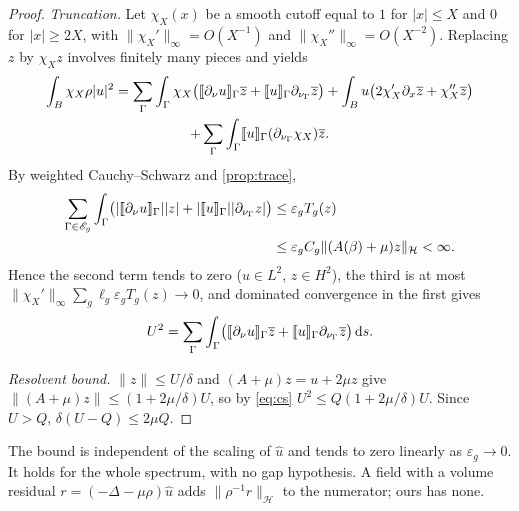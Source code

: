 \begin{proof}
\emph{Truncation.} Let $\chi_X(x)$ be a smooth cutoff equal to $1$ for
$|x|\le X$ and $0$ for $|x|\ge2X$, with $\|\chi_X'\|_\infty=O(X^{-1})$ and
$\|\chi_X''\|_\infty=O(X^{-2})$. Replacing $z$ by $\chi_Xz$ involves finitely many
pieces and yields
\begin{multline*}
  \int_B\chi_X\rho|u|^2=\sum_{\Gamma}\int_\Gamma\chi_X\bigl(\llbracket \partial_\nu u\rrbracket_\Gamma\overline z
  +\llbracket u\rrbracket_\Gamma\partial_{\nu_\Gamma}\overline z\bigr)
  +\int_Bu\bigl(2\chi_X'\partial_x\overline z+\chi_X''\overline z\bigr)\\
  +\sum_\Gamma\int_\Gamma\llbracket u\rrbracket_\Gamma(\partial_{\nu_\Gamma}\chi_X)\overline z .
\end{multline*}
By weighted Cauchy--Schwarz and \cref{prop:trace},
\begin{equation}\label{eq:cs}
\begin{aligned}
  \sum_{\Gamma\in\mathscr E_g}\int_\Gamma\bigl(|\llbracket \partial_\nu u\rrbracket_\Gamma||z|
  +|\llbracket u\rrbracket_\Gamma||\partial_{\nu_\Gamma}z|\bigr)
  &\le\varepsilon_gT_g(z)\\
  &\le\varepsilon_gC_g\|(A(\beta)+\mu)z\|_{\mathcal H}<\infty .
\end{aligned}
\end{equation}
Hence the second term tends to zero ($u\in L^2$, $z\in H^2$), the third is at
most $\|\chi_X'\|_\infty\sum_g\ell_g\varepsilon_gT_g(z)\to0$, and dominated
convergence in the first gives
\[
  U^2=\sum_\Gamma\int_\Gamma\bigl(\llbracket \partial_\nu u\rrbracket_\Gamma\overline z+\llbracket u\rrbracket_\Gamma
  \partial_{\nu_\Gamma}\overline z\bigr)\,\mathrm{d} s .
\]

\emph{Resolvent bound.} $\|z\|\le U/\delta$ and $(A+\mu)z=u+2\mu z$ give
$\|(A+\mu)z\|\le(1+2\mu/\delta)U$, so by \eqref{eq:cs}
$U^2\le Q(1+2\mu/\delta)U$. Since $U>Q$, $\delta(U-Q)\le2\mu Q$.
\end{proof}

The bound is independent of the scaling of $\widehat u$ and tends to zero
linearly as $\varepsilon_g\to0$. It holds for the whole spectrum, with no gap
hypothesis. A field with a volume residual $r=(-\Delta-\mu\rho)\widehat u$ adds
$\|\rho^{-1}r\|_{\mathcal H}$ to the numerator; ours has none.

